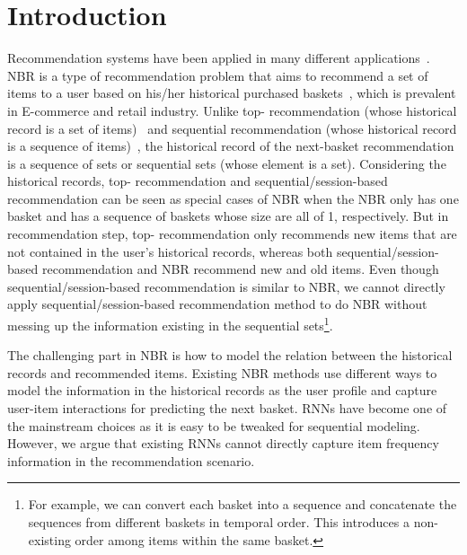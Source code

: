 \documentclass[sigconf]{acmart}
\begin{document}



\maketitle

\section{Introduction}

Recommendation systems have  been applied in many different  applications~\cite{aggarwal2016recommender}. NBR is a  type of  recommendation  problem that aims to recommend a set  of items to a user based on his/her  historical  purchased  baskets~\cite{rendle2010factorizing}\cite{ying2018sequential}\cite{wang2015learning}\cite{yu2016dynamic}, which is prevalent in E-commerce and retail industry.  Unlike top-  recommendation (whose historical  record is a set of items)~\cite{ning2015comprehensive} and sequential recommendation (whose historical record is a sequence of items)~\cite{ludewig2019performance}, the historical record of the next-basket  recommendation is a sequence of sets or sequential sets (whose element is a set). Considering the historical  records, top-  recommendation and sequential/session-based recommendation can be seen as special cases of NBR when the NBR only has one  basket and has a sequence  of baskets whose size are all of 1, respectively. But in recommendation step, top- recommendation only recommends  new items that are not  contained in the user's historical records,  whereas both  sequential/session-based  recommendation and NBR  recommend new and old items. Even though sequential/session-based recommendation is similar to NBR, we cannot directly  apply  sequential/session-based  recommendation method to do  NBR without messing up the  information  existing in the  sequential  sets\footnote{For example, we can convert each basket into a sequence and concatenate the sequences from different baskets in temporal order. This  introduces a non-existing order among items within the same basket.}.

The challenging part in NBR is how to model the relation between the  historical records and recommended  items. Existing NBR methods use  different ways to  model the information in the  historical records as the  user profile and capture user-item  interactions for predicting the next basket. RNNs have become one of the mainstream choices as it is easy to be  tweaked for sequential modeling.  However, we argue that existing RNNs  cannot directly capture item frequency  information in the recommendation  scenario. 
\end{document}

